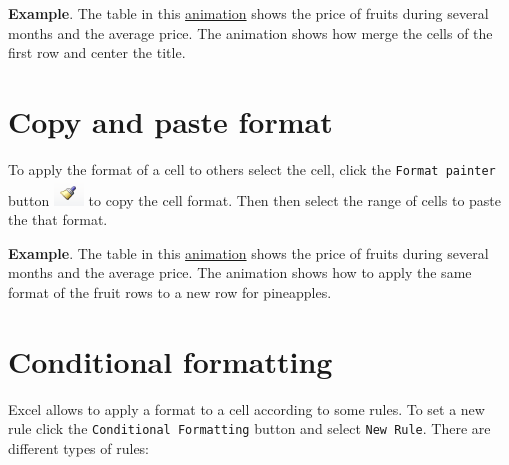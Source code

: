 \textbf{Example}. The table in this \href{http://aprendeconalf.es/office/excel/manual/img/example_merge_cells.gif}{animation} shows the price of fruits during several months and the average price. The animation shows how merge the cells of the first row and center the title.

\section{Copy and paste format}\hypertarget{copy-and-paste-format}{}\label{copy-and-paste-format}

To apply the format of a cell to others select the cell, click the \texttt{Format painter} button 
\includegraphics[scale=0.7]{../img/button_format_painter.png} to copy the cell format. Then then select the range of
cells to paste the that format.

\textbf{Example}. The table in this \href{http://aprendeconalf.es/office/excel/manual/img/example_format_painter.gif}{animation} shows the price of fruits during several months and the average price. The animation shows how to apply the same format of the fruit rows to a new row for pineapples.

\section{Conditional formatting}\hypertarget{conditional-formatting}{}\label{conditional-formatting}

Excel allows to apply a format to a cell according to some rules. To set a new rule click the
\texttt{Conditional Formatting} button and select \texttt{New Rule}. There are different types of rules:

